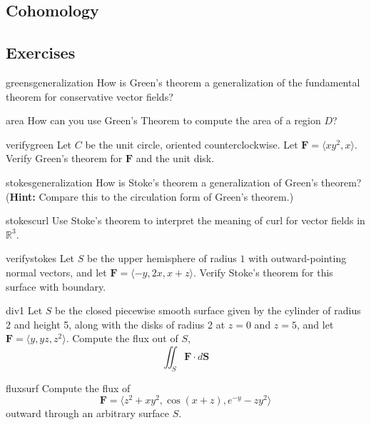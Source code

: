     
\subsection{Cohomology}



\subsection{Exercises}

\begin{problem}{greensgeneralization}
    How is Green's theorem a generalization of the fundamental theorem for conservative vector fields?
\end{problem}

\begin{problem}{area}
    How can you use Green's Theorem to compute the area of a region $D$?
\end{problem}

\begin{problem}{verifygreen}
    Let $C$ be the unit circle, oriented counterclockwise.  Let $\bm{F} = \langle xy^2, x \rangle$.  Verify Green's theorem for $\bm{F}$ and the unit disk.
\end{problem}

\begin{problem}{stokesgeneralization}
How is Stoke's theorem a generalization of Green's theorem? (\textbf{Hint:} Compare this to the circulation form of Green's theorem.)
\end{problem}

\begin{problem}{stokescurl}
    Use Stoke's theorem to interpret the meaning of curl for vector fields in $\mathbb{R}^3$.
\end{problem}

\begin{problem}{verifystokes}
    Let $S$ be the upper hemisphere of radius $1$ with outward-pointing normal vectors, and let $\bm{F} = \langle -y, 2x, x+z\rangle$.  Verify Stoke's theorem for this surface with boundary.
\end{problem}

\begin{problem}{div1}
    Let $S$ be the closed piecewise smooth surface given by the cylinder of radius 2 and height 5, along with the disks of radius 2 at $z = 0$ and $z=5$, and let $\bm{F} = \langle y, yz, z^2\rangle$.  Compute the flux out of $S$, $$\iint_{S} \bm{F} \cdot d\bm{S}$$
\end{problem}

\begin{problem}{fluxsurf}
    Compute the flux of $$\bm{F} = \langle z^2 + xy^2, \cos(x+z), e^{-y} - zy^2 \rangle$$ outward through an arbitrary surface $S$.
\end{problem}